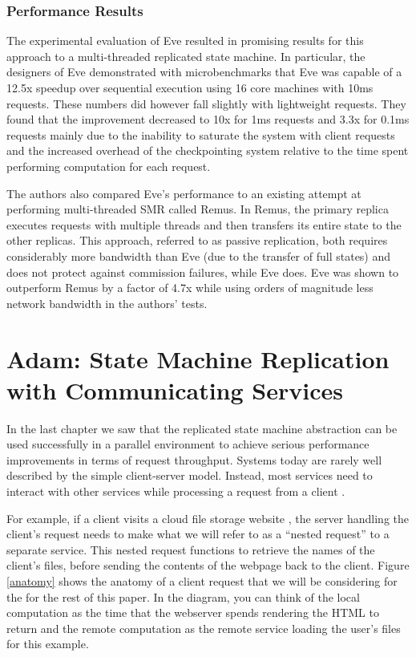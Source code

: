 \documentclass[11pt, oneside]{report}
\begin{document}
\subsection{Performance Results}\label{EveResults}

The experimental evaluation of Eve resulted in promising results for this approach to a multi-threaded replicated state machine. 
In particular, the designers of Eve demonstrated with microbenchmarks that Eve was capable of a 12.5x speedup over sequential execution using 16 core machines with 10ms requests. 
These numbers did however fall slightly with lightweight requests. 
They found that the improvement decreased to 10x for 1ms requests and 3.3x for 0.1ms requests mainly due to the inability to saturate the system with client requests and the increased overhead of the checkpointing system relative to the time spent performing computation for each request.

The authors also compared Eve's performance to an existing attempt at performing multi-threaded SMR called Remus. 
In Remus, the primary replica executes requests with multiple threads and then transfers its entire state to the other replicas. 
This approach, referred to as passive replication, both requires considerably more bandwidth than Eve (due to the transfer of full states) and does not protect against commission failures, while Eve does. 
Eve was shown to outperform Remus by a factor of 4.7x while using orders of magnitude less network bandwidth in the authors' tests.

\chapter{Adam: State Machine Replication with Communicating Services}\label{Adam}

In the last chapter we saw that the replicated state machine abstraction can be used successfully in a parallel environment to achieve serious performance improvements in terms of request throughput. 
Systems today are rarely well described by the simple client-server model.
Instead, most services need to interact with other services while processing a request from a client \cite{spanner, tao, dynamo}. 

For example, if a client visits a cloud file storage website \cite{dropbox}, the server handling the client's request needs to make what we will refer to as a ``nested request'' to a separate service. This nested request functions to retrieve the names of the client's files, before sending the contents of the webpage back to the client. Figure \ref{anatomy} shows the anatomy of a client request that we will be considering for the for the rest of this paper. In the diagram, you can think of the local computation as the time that the webserver spends rendering the HTML to return and the remote computation as the remote service loading the user's files for this example.
\end{document}
